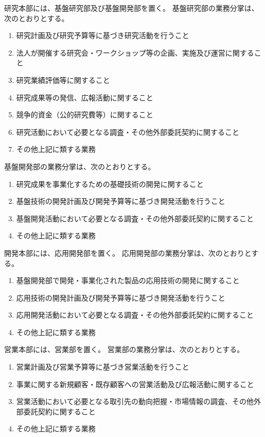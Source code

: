 \documentclass[10pt,a4paper,uplatex,dvipdfmx]{jsarticle}
\begin{document}
研究本部には、基盤研究部及び基盤開発部を置く。
\term 基盤研究部の業務分掌は、次のとおりとする。
\begin{enumerate}
	\item 研究計画及び研究予算等に基づき研究活動を行うこと
	\item 法人が開催する研究会・ワークショップ等の企画、実施及び運営に関すること
	\item 研究業績評価等に関すること
	\item 研究成果等の発信、広報活動に関すること
	\item 競争的資金（公的研究費等）に関すること
	\item 研究活動において必要となる調査・その他外部委託契約に関すること
	\item その他上記に類する業務
\end{enumerate}

\term 基盤開発部の業務分掌は、次のとおりとする。
\begin{enumerate}
	\item 研究成果を事業化するための基礎技術の開発に関すること
	\item 基盤技術の開発計画及び開発予算等に基づき開発活動を行うこと
	\item 基盤開発活動において必要となる調査・その他外部委託契約に関すること
	\item その他上記に類する業務
\end{enumerate}

開発本部には、応用開発部を置く。
\term 応用開発部の業務分掌は、次のとおりとする。
\begin{enumerate}
	\item 基盤開発部で開発・事業化された製品の応用技術の開発に関すること
	\item 応用技術の開発計画及び開発予算等に基づき開発活動を行うこと
	\item 応用開発活動において必要となる調査・その他外部委託契約に関すること
	\item その他上記に類する業務
\end{enumerate}

営業本部には、営業部を置く。
\term 営業部の業務分掌は、次のとおりとする。
\begin{enumerate}
	\item 営業計画及び営業予算等に基づき営業活動を行うこと
	\item 事業に関する新規顧客・既存顧客への営業活動及び広報活動に関すること
	\item 営業活動において必要となる取引先の動向把握・市場情報の調査、その他外部委託契約に関すること
	\item その他上記に類する業務
\end{enumerate}
\end{document}
